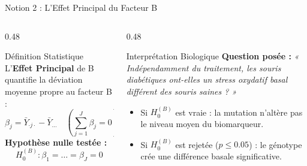 \documentclass[aspectratio=169,10pt]{beamer}
\begin{document}
\begin{frame}{Notion 2 : L'Effet Principal du Facteur B}
  \begin{columns}[onlytextwidth, T]
    \begin{column}{0.48\linewidth}
      \begin{conceptbox}{Définition Statistique}
        \small
        L'\textbf{Effet Principal} de B quantifie la déviation moyenne propre au facteur B :
        \begin{equation*}
          \beta_j = \bar{Y}_{\cdot j\cdot} - \bar{Y}_{\dots} \quad \left(\sum_{j=1}^J \beta_j = 0\right)
        \end{equation*}
        \textbf{Hypothèse nulle testée :}
        \begin{equation*}
          H_0^{(B)} : \beta_1 = \dots = \beta_J = 0
        \end{equation*}
      \end{conceptbox}
    \end{column}
    \begin{column}{0.48\linewidth}
      \begin{biobox}{Interprétation Biologique}
        \small
        \textbf{Question posée :} \textit{« Indépendamment du traitement, les souris diabétiques ont-elles un stress oxydatif basal différent des souris saines ? »}
        \begin{itemize}
          \item Si $H_0^{(B)}$ est vraie : la mutation n'altère pas le niveau moyen du biomarqueur.
          \item Si $H_0^{(B)}$ est rejetée ($p \le 0.05$) : le génotype crée une différence basale significative.
        \end{itemize}
      \end{biobox}
    \end{column}
  \end{columns}
\end{frame}
\end{document}
